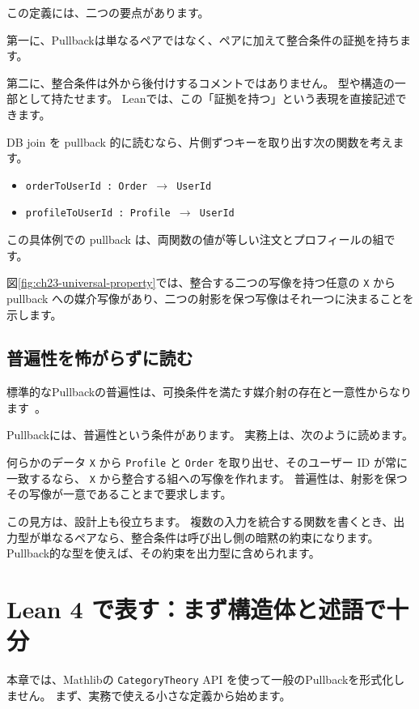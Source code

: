 この定義には、二つの要点があります。

第一に、Pullbackは単なるペアではなく、ペアに加えて整合条件の証拠を持ちます。

第二に、整合条件は外から後付けするコメントではありません。
型や構造の一部として持たせます。
Leanでは、この「証拠を持つ」という表現を直接記述できます。

DB join を pullback 的に読むなら、片側ずつキーを取り出す次の関数を考えます。
\begin{itemize}
\item \texttt{orderToUserId : Order \ensuremath{\to} UserId}
\item \texttt{profileToUserId : Profile \ensuremath{\to} UserId}
\end{itemize}
この具体例での pullback は、両関数の値が等しい注文とプロフィールの組です。

図\ref{fig:ch23-universal-property}では、整合する二つの写像を持つ任意の \texttt{X} から pullback への媒介写像があり、二つの射影を保つ写像はそれ一つに決まることを示します。


\subsection{普遍性を怖がらずに読む}

標準的なPullbackの普遍性は、可換条件を満たす媒介射の存在と一意性からなります~\cite{leinster-basic-category-theory,riehl-category-theory-in-context}。

Pullbackには、普遍性という条件があります。
実務上は、次のように読めます。

何らかのデータ \texttt{X} から \texttt{Profile} と \texttt{Order} を取り出せ、そのユーザー ID が常に一致するなら、
\texttt{X} から整合する組への写像を作れます。
普遍性は、射影を保つその写像が一意であることまで要求します。

この見方は、設計上も役立ちます。
複数の入力を統合する関数を書くとき、出力型が単なるペアなら、整合条件は呼び出し側の暗黙の約束になります。
Pullback的な型を使えば、その約束を出力型に含められます。

\section{Lean 4 で表す：まず構造体と述語で十分}

本章では、Mathlibの \texttt{CategoryTheory} API を使って一般のPullbackを形式化しません。
まず、実務で使える小さな定義から始めます。


